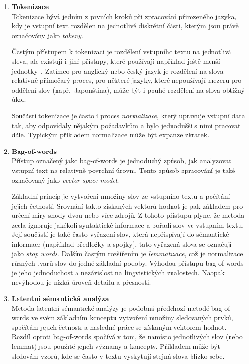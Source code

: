 \begin{enumerate}
	\item \textbf{Tokenizace}\\
	      Tokenizace bývá jedním z prvních kroků při zpracování přirozeného jazyka, kdy je vstupní text
	      rozdělen na jednotlivé diskrétní části, kterým jsou právě označovány jako \emph{tokeny}.~\cite{the_conversational_interface}

	      Častým přístupem k tokenizaci je rozdělení vstupního textu na jednotlivá slova,
	      ale existují i jiné přístupy, které používají například ještě menší jednotky~\cite{yang2024rethinking}.
	      Zatímco pro anglický nebo český jazyk je rozdělení na slova relativně přímočarý proces, pro některé jazyky,
	      které nepoužívají mezeru pro oddělení slov (např.~Japonština), může být i pouhé rozdělení na slova obtížný úkol.~\cite{the_conversational_interface}

	      Součástí tokenizace je často i proces \emph{normalizace}, který upravuje vstupní data tak, aby odpovídaly nějakým požadavkům
	      a bylo jednodušší s nimi pracovat dále.
	      Typickým příkladem normalizace může být expanze zkratek.~\cite{the_conversational_interface}

	\item \textbf{Bag-of-words}\\
	      Přístup označený jako bag-of-words je jednoduchý způsob, jak analyzovat vstupní text na relativně povrchní úrovni.
	      Tento způsob zpracování je také označovaný jako \emph{vector space model}.~\cite{the_conversational_interface}

	      Základní princip je vytvoření množiny slov ze vstupního textu a počítání jejich četností.
	      Srovnání takto získaných vektorů hodnot je pak základem pro určení míry shody dvou nebo více zdrojů.
	      Z tohoto přístupu plyne, že metoda zcela ignoruje jakékoli syntaktické informace a pořadí slov ve vstupním textu.
	      Její součástí je také často vyřazení slov, která nepřispívají do sémantické informace (například předložky a spojky),
	      tato vyřazená slova se označují jako \emph{stop words}.
	      Dalším častým rozšířením je \emph{lemmatizace}, což je normalizace různých tvarů slov do jedné základní podoby.
	      Výhodou přístupu bag-of-words je jeho jednoduchost a nezávislost na lingvistických znalostech.
	      Naopak nevýhodou je nízká úroveň detailu a přesnosti.~\cite{the_conversational_interface}

	\item \textbf{Latentní sémantická analýza}\\
	      Metoda latentní sémantické analýzy je podobná předchozí metodě bag-of-words ve svém základním konceptu vytvoření množiny
	      sledovaných prvků, spočítání jejich četnosti a následné práce se získaným vektorem hodnot.
	      Rozdíl oproti bag-of-words spočívá v tom, že namísto jednotlivých slov (nebo lemmat) jsou použité jejich významy a koncepty.
	      Příkladem může být sledování vzorů, kde se často v textu vyskytují stejná slova blízko sebe.~\cite{the_conversational_interface}


\end{enumerate}
